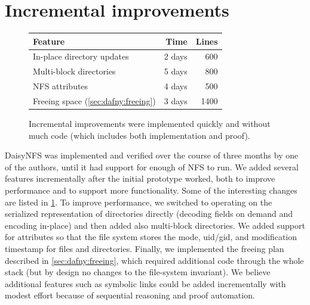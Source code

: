 
\section{Incremental improvements}
\label{sec:eval:incremental}

\begin{figure}
\small
\begin{center}
\begin{tabular}{lrr}
  \toprule
  \textbf{Feature} & \textbf{Time} & \textbf{Lines} \\
  \midrule
  In-place directory updates & 2 days & 600\\
  Multi-block directories & 5 days & 800 \\
  NFS attributes & 4 days & 500 \\
  Freeing space (\cref{sec:dafny:freeing}) & 3 days & 1400\\
  \bottomrule
\end{tabular}
\end{center}
\caption{Incremental improvements were implemented quickly and without much
  code (which includes both implementation and proof).}
\label{fig:features}
\end{figure}

DaisyNFS was implemented and verified over the course of three months by
one of the authors, until it had support for enough of NFS to run. We
added several features incrementally after the initial prototype
worked, both to improve performance and to support more
functionality. Some of the interesting changes are listed in
\cref{fig:features}.  To improve performance, we switched to
operating on the serialized representation of directories directly
(decoding fields on demand and encoding in-place) and then added also
multi-block directories.  We added support for attributes so that the file
system stores the mode, uid/gid, and modification timestamp for files and directories.
Finally, we implemented the freeing plan described
in \cref{sec:dafny:freeing}, which required additional code through the
whole stack (but by design no changes to the file-system invariant).
We believe additional features such as symbolic links
could be added incrementally with modest effort because
of sequential reasoning and proof automation.

